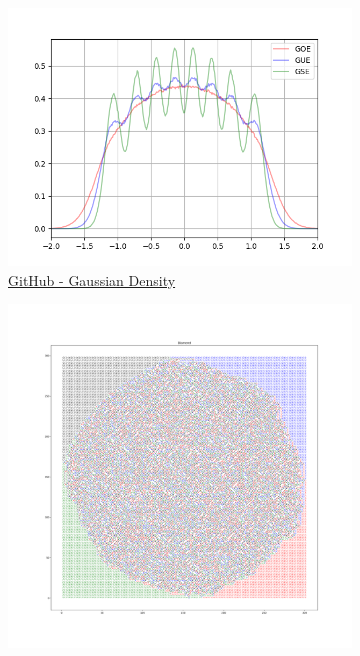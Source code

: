 \documentclass[12pt]{report}
\begin{document}
\begin{figure}
	\begin{subfigure}{.5\textwidth}
		\centering
		\includegraphics[width=\linewidth]{Assets/FullGaussianDensityEscaled}
		\caption{\href{https://github.com/Joao-vap/RMT-Code/blob/main/GaussianDensity.py}{GitHub - Gaussian Density} \\}
		\label{fig:a1}
	\end{subfigure}%
	\begin{subfigure}{.5\textwidth}
		\centering
		\includegraphics[width=\linewidth]{Assets/AstecDiamond}

\end{subfigure}
\end{figure}
\end{document}
